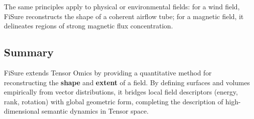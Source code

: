 \documentclass{article}
\begin{document}
The same principles apply to physical or environmental fields:
for a wind field, FiSure reconstructs the shape of a coherent 
airflow tube; for a magnetic field, it delineates regions of 
strong magnetic flux concentration.

\subsection{Summary}

FiSure extends Tensor Omics by providing a quantitative 
method for reconstructing the \textbf{shape} and 
\textbf{extent} of a field.  
By defining surfaces and volumes empirically from vector distributions, 
it bridges local field descriptors (energy, rank, rotation) with 
global geometric form, completing the description of 
high-dimensional semantic dynamics in Tensor space.
\end{document}
